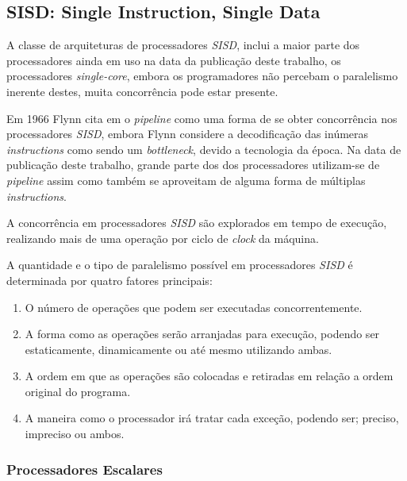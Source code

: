 \subsection{SISD: Single Instruction, Single Data}

A classe de arquiteturas de processadores \textit{SISD}, inclui a 
maior parte dos processadores ainda em uso na data da publicação deste trabalho, 
os processadores 
\textit{single-core}, embora os programadores não percebam o paralelismo 
inerente destes, muita concorrência pode estar presente.  

Em 1966 Flynn cita em \cite{Flynn:1996} o \textit{pipeline} como uma forma de 
se obter concorrência 
nos processadores \textit{SISD}, embora Flynn considere a decodificação das 
inúmeras \textit{instructions} como sendo um \textit{bottleneck}, devido a 
tecnologia da época. 
Na data de publicação deste trabalho, grande parte dos dos processadores 
utilizam-se de \textit{pipeline} assim como também se aproveitam de alguma forma 
de múltiplas \textit{instructions}.

A concorrência em processadores \textit{SISD} são explorados em tempo de execução,
realizando mais de uma operação por ciclo de \textit{clock} da máquina.

A quantidade e o tipo de paralelismo possível em processadores \textit{SISD}
é determinada por quatro fatores principais:

\begin{enumerate}
        \item O número de operações que podem ser executadas concorrentemente.
        \item A forma como as operações serão arranjadas para execução,
                podendo ser estaticamente, dinamicamente ou até mesmo utilizando
                ambas.
        \item A ordem em que as operações são colocadas e retiradas em relação
                a ordem original do programa.
        \item A maneira como o processador irá tratar cada exceção, podendo ser; 
                preciso, impreciso ou ambos.
\end{enumerate}

\subsubsection{Processadores Escalares}

